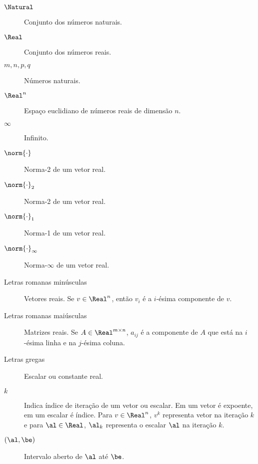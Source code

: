 
\begin{description}

	    \item[$\Natural$] Conjunto dos números naturais.

    \item[$\Real$] Conjunto dos números reais.

    \item[$m, n, p, q$] Números naturais.

    \item[$\Real^n$] Espaço euclidiano de  números reais de dimensão $n$.

    \item[$\infty$] Infinito.

    
    \item[$\norm{\cdot}$] Norma-2 de um vetor real.

    \item[$\norm{\cdot}_{2}$] Norma-2 de um vetor real.

    \item[$\norm{\cdot}_{1}$] Norma-1 de um vetor real.

    \item[$\norm{\cdot}_{\infty}$] Norma-$\infty$ de um vetor real.

     \item[Letras romanas minúsculas] Vetores reais. Se $v\in\Real^{n}$, então $v_{i}$ é a $i$-ésima componente de $v$.

    \item[Letras romanas maiúsculas] Matrizes reais. Se $A\in\Real^{m\times n}$, $a_{ij}$ é a componente de $A$ que está na $i$-ésima linha e na $j$-ésima coluna.

    \item[Letras gregas] Escalar ou constante real.

    \item[$k$] Indica índice de iteração de um vetor ou escalar. Em um vetor é expoente, em um escalar é índice.  Para $v\in\Real^{n}$, $v^{k}$ representa vetor na iteração $k$ e para $\al\in\Real$, $\al_{k}$ representa o escalar $\al$ na iteração $k$. 



    \item[$(\al, \be)$] Intervalo aberto de $\al$ até $\be$.


\end{description}
